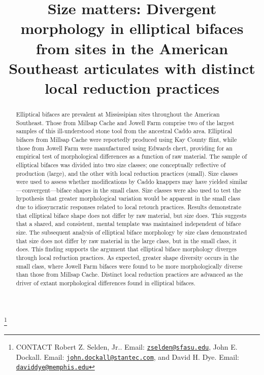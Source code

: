 \documentclass[]{interact}
\theoremstyle{plain}%
\theoremstyle{definition}
\theoremstyle{remark}
\begin{document}

\title{Size matters: Divergent morphology in elliptical bifaces from
sites in the American Southeast articulates with distinct local
reduction practices}


\author{
}

\thanks{CONTACT Robert Z. Selden,
Jr.. Email: \href{mailto:zselden@sfasu.edu}{\nolinkurl{zselden@sfasu.edu}}, John
E.
Dockall. Email: \href{mailto:john.dockall@stantec.com}{\nolinkurl{john.dockall@stantec.com}}, and
David H.
Dye. Email: \href{mailto:daviddye@memphis.edu}{\nolinkurl{daviddye@memphis.edu}}}

\maketitle

\begin{abstract}
Elliptical bifaces are prevalent at Mississipian sites throughout the
American Southeast. Those from Millsap Cache and Jowell Farm comprise
two of the largest samples of this ill-understood stone tool from the
ancestral Caddo area. Elliptical bifaces from Millsap Cache were
reportedly produced using Kay County flint, while those from Jowell Farm
were manufactured using Edwards chert, providing for an empirical test
of morphological differences as a function of raw material. The sample
of elliptical bifaces was divided into two size classes; one
conceptually reflective of production (large), and the other with local
reduction practices (small). Size classes were used to assess whether
modifications by Caddo knappers may have yielded
similar---convergent---biface shapes in the small class. Size classes
were also used to test the hypothesis that greater morphological
variation would be apparent in the small class due to idiosyncratic
responses related to local retouch practices. Results demonstrate that
elliptical biface shape does not differ by raw material, but size does.
This suggests that a shared, and consistent, mental template was
maintained independent of biface size. The subsequent analysis of
elliptical biface morphology by size class demonstrated that size does
not differ by raw material in the large class, but in the small class,
it does. This finding supports the argument that elliptical biface
morphology diverges through local reduction practices. As expected,
greater shape diversity occurs in the small class, where Jowell Farm
bifaces were found to be more morphologically diverse than those from
Millsap Cache. Distinct local reduction practices are advanced as the
driver of extant morphological differences found in elliptical bifaces.
\end{abstract}
\end{document}
